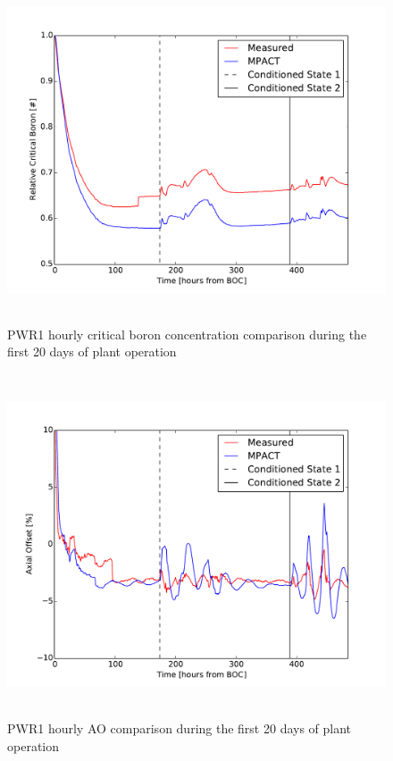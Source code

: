 \documentclass[edeposit,fullpage,11pt]{uiucthesis2009}
\begin{document}
\begin{figure}[h]
\begin{center}
\includegraphics[height=4in]{./Figures/M_boron.pdf} 
\end{center}
\caption{PWR1 hourly critical boron concentration  comparison  during the first 20 days of plant operation}
\label{fig:lf_his2}
\end{figure}

\begin{figure}[h]
\begin{center}
\includegraphics[height=4in]{./Figures/M_AO.pdf} 
\end{center}
\caption{PWR1 hourly \gls{AO} comparison during the first 20 days of plant operation}
\label{fig:lf_his1}
\end{figure}
\end{document}
